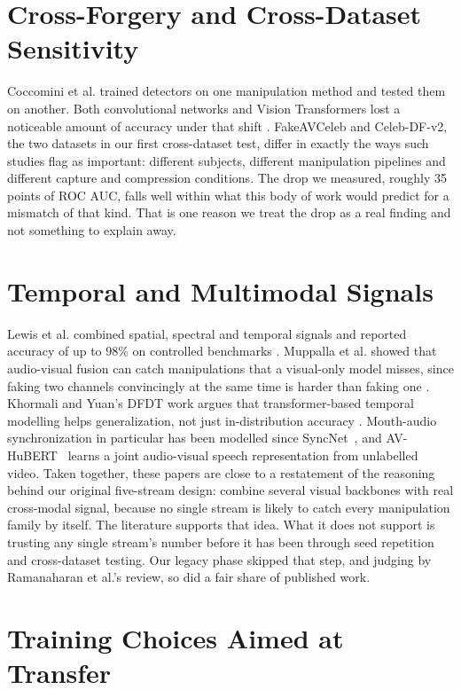 \section{Cross-Forgery and Cross-Dataset Sensitivity}

Coccomini et al. trained detectors on one manipulation method and tested them
on another. Both convolutional networks and Vision Transformers lost a
noticeable amount of accuracy under that shift \cite{coccomini2022}.
FakeAVCeleb and Celeb-DF-v2, the two datasets in our first cross-dataset test,
differ in exactly the ways such studies flag as important: different subjects,
different manipulation pipelines and different capture and compression
conditions. The drop we measured, roughly 35 points of ROC AUC, falls well
within what this body of work would predict for a mismatch of that kind. That
is one reason we treat the drop as a real finding and not something to explain
away.

\section{Temporal and Multimodal Signals}

Lewis et al. combined spatial, spectral and temporal signals and reported
accuracy of up to 98\% on controlled benchmarks \cite{lewis2020}. Muppalla et
al. showed that audio-visual fusion can catch manipulations that a visual-only
model misses, since faking two channels convincingly at the same time is
harder than faking one \cite{muppalla2023}. Khormali and Yuan's DFDT work
argues that transformer-based temporal modelling helps generalization, not just
in-distribution accuracy \cite{khormali2022}. Mouth-audio synchronization in
particular has been modelled since SyncNet~\cite{syncnet}, and
AV-HuBERT~\cite{avhubert} learns a joint audio-visual speech representation
from unlabelled video. Taken together, these papers are close to a restatement
of the reasoning behind our original five-stream design: combine several visual
backbones with real cross-modal signal, because no single stream is likely to
catch every manipulation family by itself. The literature supports that idea.
What it does not support is trusting any single stream's number before it has
been through seed repetition and cross-dataset testing. Our legacy phase
skipped that step, and judging by Ramanaharan et al.'s review, so did a fair
share of published work.

\section{Training Choices Aimed at Transfer}

